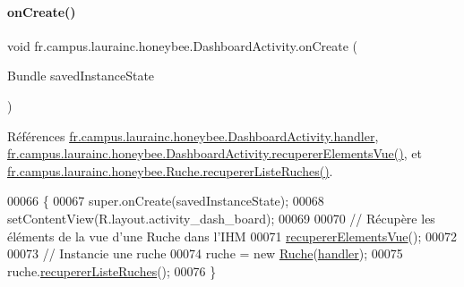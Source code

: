 \paragraph{\texorpdfstring{on\+Create()}{onCreate()}}
{\footnotesize\ttfamily void fr.\+campus.\+laurainc.\+honeybee.\+Dashboard\+Activity.\+on\+Create (\begin{DoxyParamCaption}\item[{Bundle}]{saved\+Instance\+State }\end{DoxyParamCaption})\hspace{0.3cm}{\ttfamily [protected]}}



Références \hyperlink{classfr_1_1campus_1_1laurainc_1_1honeybee_1_1_dashboard_activity_a7dd06030cd3afe35ace9a5e2f9e789dd}{fr.\+campus.\+laurainc.\+honeybee.\+Dashboard\+Activity.\+handler}, \hyperlink{classfr_1_1campus_1_1laurainc_1_1honeybee_1_1_dashboard_activity_a2ab46c5580913347e2dd18976be5900a}{fr.\+campus.\+laurainc.\+honeybee.\+Dashboard\+Activity.\+recuperer\+Elements\+Vue()}, et \hyperlink{classfr_1_1campus_1_1laurainc_1_1honeybee_1_1_ruche_aba0591cda391b907da41a0afeba4d59d}{fr.\+campus.\+laurainc.\+honeybee.\+Ruche.\+recuperer\+Liste\+Ruches()}.


\begin{DoxyCode}
00066     \{
00067         super.onCreate(savedInstanceState);
00068         setContentView(R.layout.activity\_dash\_board);
00069 
00070         \textcolor{comment}{// Récupère les éléments de la vue d'une Ruche dans l'IHM}
00071         \hyperlink{classfr_1_1campus_1_1laurainc_1_1honeybee_1_1_dashboard_activity_a2ab46c5580913347e2dd18976be5900a}{recupererElementsVue}();
00072 
00073         \textcolor{comment}{// Instancie une ruche}
00074         ruche = \textcolor{keyword}{new} \hyperlink{class_ruche}{Ruche}(\hyperlink{classfr_1_1campus_1_1laurainc_1_1honeybee_1_1_dashboard_activity_a7dd06030cd3afe35ace9a5e2f9e789dd}{handler});
00075         ruche.\hyperlink{classfr_1_1campus_1_1laurainc_1_1honeybee_1_1_ruche_aba0591cda391b907da41a0afeba4d59d}{recupererListeRuches}();
00076     \}
\end{DoxyCode}
\mbox{\label{classfr_1_1campus_1_1laurainc_1_1honeybee_1_1_dashboard_activity_a2ab46c5580913347e2dd18976be5900a}} 
